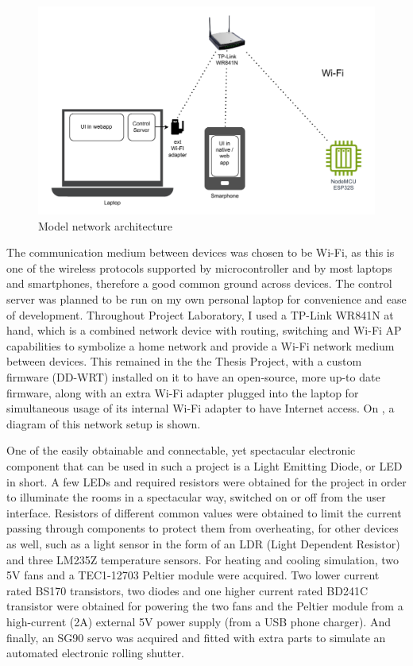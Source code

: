 \begin{figure}[!ht]
    \centering
    \includegraphics[page=1,keepaspectratio,width=150mm]{figures/box_network.drawio.pdf}
    \caption{Model network architecture}
    \label{fig:BoxNetwork}
\end{figure}

The communication medium between devices was chosen to be Wi-Fi, as this is one of the wireless protocols supported by microcontroller and by most laptops and smartphones, therefore a good common ground across devices. The control server was planned to be run on my own personal laptop for convenience and ease of development. Throughout Project Laboratory, I used a TP-Link WR841N at hand, which is a combined network device with routing, switching and Wi-Fi AP capabilities to symbolize a home network and provide a Wi-Fi network medium between devices. This remained in the the Thesis Project, with a custom firmware (DD-WRT) installed on it to have an open-source, more up-to date firmware, along with an extra Wi-Fi adapter plugged into the laptop for simultaneous usage of its internal Wi-Fi adapter to have Internet access. On , a diagram of this network setup is shown.

One of the easily obtainable and connectable, yet spectacular electronic component that can be used in such a project is a Light Emitting Diode, or LED in short. A few LEDs and required resistors were obtained for the project in order to illuminate the rooms in a spectacular way, switched on or off from the user interface. Resistors of different common values were obtained to limit the current passing through components to protect them from overheating, for other devices as well, such as a light sensor in the form of an LDR (Light Dependent Resistor) and three LM235Z temperature sensors. For heating and cooling simulation, two 5V fans and a TEC1-12703 Peltier module were acquired. Two lower current rated BS170 transistors, two diodes and one higher current rated BD241C transistor were obtained for powering the two fans and the Peltier module from a high-current (2A) external 5V power supply (from a USB phone charger). And finally, an SG90 servo was acquired and fitted with extra parts to simulate an automated electronic rolling shutter.

